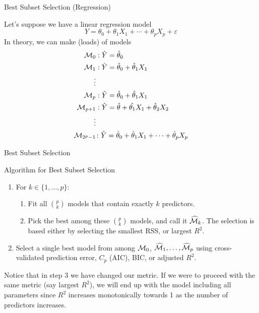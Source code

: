 \documentclass{beamer}
\begin{document}
\begin{frame}{Best Subset Selection (Regression) }
	
	Let's suppose we have a linear regression model
	\begin{equation*}
		Y = \theta_0+ \theta_1 X_1 + \cdots + \theta_p X_p + \varepsilon
	\end{equation*}
In theory, we can make (loads) of models 
\begin{equation*}
	\begin{split}
		{\cal M}_0 &: \hat{Y}= \hat{\theta}_0\\
				{\cal M}_1 &: \hat{Y}= \hat{\theta}_0+ \hat{\theta}_1 X_1 \\
				\vdots&\\
				{\cal M}_p &: \hat{Y}= \hat{\theta}_0+ \hat{\theta}_1 X_1 \\
				{\cal M}_{p+1} &: \hat{Y}= \hat{\theta}+ \hat{\theta_1} X_1+ \hat{\theta}_2 X_2  \\
				\vdots &\\
				{\cal M}_{2^p-1}& \colon \hat{Y }= \hat{\theta}_0+ \hat{\theta}_1 X_1 + \cdots + \hat{\theta}_p X_p 
	\end{split}
\end{equation*}
\end{frame}

\begin{frame}{Best Subset Selection}
	
	Algorithm for Best Subset Selection
	\begin{enumerate}
		\item For $k\in \{1,\ldots,p\}$:
		\begin{enumerate}
			\item Fit all $p \choose k$ models that contain exactly $k$ predictors.
			\item Pick the best among these $p \choose k$ models, and call it $\widehat{\cal M}_k$. The selection is based either by selecting the smallest RSS, or largest $R^2$.
		\end{enumerate}
	\item Select a single best model from among ${\cal M}_0$, $\widehat{\cal M}_1,\ldots, \widehat{\cal M}_p$ using cross-validated prediction error, $C_p$ (AIC), BIC, or adjusted $R^2$.
	\end{enumerate}
Notice that in step 3 we have changed our metric. If we were to proceed with the same metric (say largest $R^2$), we will end up with the model including all parameters since $R^2$ increases monotonically towards 1 as the number of predictors increases. 
\end{frame}
\end{document}
